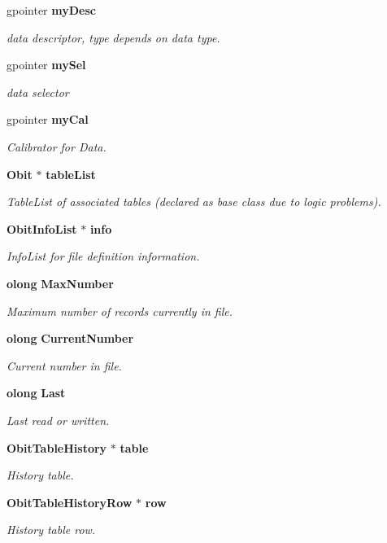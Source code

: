 \begin{CompactItemize}
gpointer {\bf my\-Desc}
\begin{CompactList}\small\item\em data descriptor, type depends on data type. \item\end{CompactList}\item 
gpointer {\bf my\-Sel}
\begin{CompactList}\small\item\em data selector \item\end{CompactList}\item 
gpointer {\bf my\-Cal}
\begin{CompactList}\small\item\em Calibrator for Data. \item\end{CompactList}\item 
{\bf Obit} $\ast$ {\bf table\-List}
\begin{CompactList}\small\item\em Table\-List of associated tables (declared as base class due to logic problems). \item\end{CompactList}\item 
{\bf Obit\-Info\-List} $\ast$ {\bf info}
\begin{CompactList}\small\item\em Info\-List for file definition information. \item\end{CompactList}\item 
{\bf olong} {\bf Max\-Number}
\begin{CompactList}\small\item\em Maximum number of records currently in file. \item\end{CompactList}\item 
{\bf olong} {\bf Current\-Number}
\begin{CompactList}\small\item\em Current number in file. \item\end{CompactList}\item 
{\bf olong} {\bf Last}
\begin{CompactList}\small\item\em Last read or written. \item\end{CompactList}\item 
{\bf Obit\-Table\-History} $\ast$ {\bf table}
\begin{CompactList}\small\item\em History table. \item\end{CompactList}\item 
{\bf Obit\-Table\-History\-Row} $\ast$ {\bf row}
\begin{CompactList}\small\item\em History table row. \item\end{CompactList}\end{CompactItemize}


